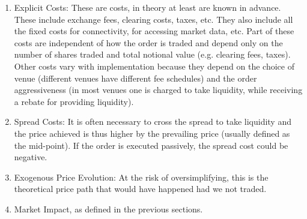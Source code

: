 \begin{enumerate}
\item Explicit Costs: These are costs, in theory at least are known in advance. These include exchange fees, clearing costs, taxes, etc. They also include all the fixed costs for connectivity, for accessing market data, etc. Part of these costs are independent of how the order is traded and depend only on the number of shares traded and total notional value (e.g. clearing fees, taxes). Other costs vary with implementation because they depend on the choice of venue (different venues have different fee schedules) and the order aggressiveness (in most venues one is charged to take liquidity, while receiving a rebate for providing liquidity).

\item Spread Costs: It is often necessary to cross the spread to take liquidity and the price achieved is thus higher by the prevailing price (usually defined as the mid-point). If the order is executed passively, the spread cost could be negative.




\item Exogenous Price Evolution: At the risk of oversimplifying, this is the theoretical price path that would have happened had we not traded.

\item Market Impact, as defined in the previous sections.  
\end{enumerate}


